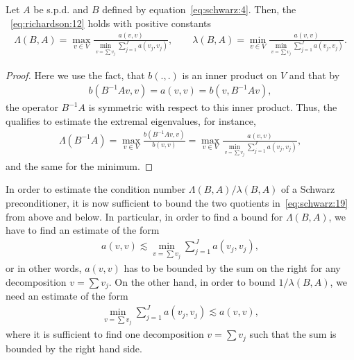 \begin{theorem}
  \label{theorem:schwarz:1}
  Let $A$ be s.p.d. and $B$ defined by
  equation~\eqref{eq:schwarz:4}. Then, the ~\eqref{eq:richardson:12} holds with
  positive constants
  \begin{gather}
    \label{eq:schwarz:19}
    \Lambda(B,A) = \max_{v\in V} \frac{a(v,v)}{\min\limits_{v=\sum v_j}
      \sum\limits_{j=1}^J a(v_j, v_j)}
    ,\qquad
    \lambda(B,A) = \min\limits_{v\in V} \frac{a(v,v)}{\min\limits_{v=\sum v_j}
      \sum\limits_{j=1}^J a(v_j, v_j)}.
  \end{gather}
\end{theorem}

\begin{proof}
  Here we use the fact, that $b(.,.)$ is an inner product on
  $V$ and that by
  \begin{gather*}
    b(B^{-1}A v,v) = a(v,v) = b(v, B^{-1}A v),
  \end{gather*}
  the operator $B^{-1}A$ is symmetric with respect to this inner
  product. Thus, the  qualifies to
  estimate the extremal eigenvalues, for instance,
  \begin{gather*}
    \Lambda(B^{-1}A)
    = \max_{v\in V} \frac{b(B^{-1}A v,v)}{b(v,v)}
    = \max_{v\in V} \frac{a(v,v)}{\min\limits_{v=\sum v_j}
      \sum\limits_{j=1}^J a(v_j, v_j)},
  \end{gather*}
  and the same for the minimum.
\end{proof}

\begin{note}
  \label{note:schwarz:1}
  In order to estimate the condition number $\Lambda(B,A)/\lambda(B,A)$ of a Schwarz
  preconditioner, it is now sufficient to bound the two quotients
  in~\eqref{eq:schwarz:19} from above and below. In particular, in
  order to find a bound for $\Lambda(B,A)$, we have to find an estimate of
  the form
  \begin{gather}
    \label{eq:schwarz:23}
    a(v,v) \lesssim \min_{v=\sum v_j}\sum_{j=1}^J a(v_j, v_j),
  \end{gather}
  or in other words, $a(v,v)$ has to be bounded by the sum on the
  right for any decomposition $v=\sum v_j$. On the other hand, in
  order to bound $1/\lambda(B,A)$, we need an estimate of the form
  \begin{gather}
    \label{eq:schwarz:24}
     \min_{v=\sum v_j}\sum_{j=1}^J a(v_j, v_j) \lesssim a(v,v),
  \end{gather}
  where it is sufficient to find one decomposition $v=\sum v_j$ such
  that the sum is bounded by the right hand side.
\end{note}

